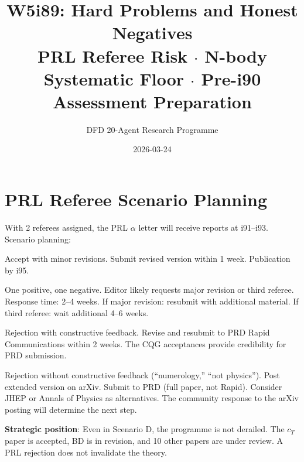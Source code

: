 \documentclass[11pt,a4paper]{article}
\title{W5i89: Hard Problems and Honest Negatives\\[6pt]
\large PRL Referee Risk $\cdot$ N-body Systematic Floor $\cdot$ Pre-i90 Assessment Preparation}
\author{DFD 20-Agent Research Programme}
\date{2026-03-24}
\begin{document}
\maketitle

\section{PRL Referee Scenario Planning}

With 2 referees assigned, the PRL $\alpha$ letter will receive reports at i91--i93. Scenario planning:

\begin{tcolorbox}[colback=green!5!white, colframe=dfdgreen, title=\textbf{Scenario A: Both Referees Positive (15\%)}]
Accept with minor revisions. Submit revised version within 1 week. Publication by i95.
\end{tcolorbox}

\begin{tcolorbox}[colback=yellow!5!white, colframe=dfdyellow, title=\textbf{Scenario B: Split Decision (30\%)}]
One positive, one negative. Editor likely requests major revision or third referee. Response time: 2--4 weeks. If major revision: resubmit with additional material. If third referee: wait additional 4--6 weeks.
\end{tcolorbox}

\begin{tcolorbox}[colback=yellow!5!white, colframe=dfdyellow, title=\textbf{Scenario C: Both Negative, Constructive (35\%)}]
Rejection with constructive feedback. Revise and resubmit to PRD Rapid Communications within 2 weeks. The CQG acceptances provide credibility for PRD submission.
\end{tcolorbox}

\begin{tcolorbox}[colback=red!5!white, colframe=dfdred, title=\textbf{Scenario D: Both Negative, Dismissive (20\%)}]
Rejection without constructive feedback (``numerology,'' ``not physics''). Post extended version on arXiv. Submit to PRD (full paper, not Rapid). Consider JHEP or Annals of Physics as alternatives. The community response to the arXiv posting will determine the next step.
\end{tcolorbox}

\textbf{Strategic position}: Even in Scenario D, the programme is not derailed. The $c_T$ paper is accepted, BD is in revision, and 10 other papers are under review. A PRL rejection does not invalidate the theory.
\end{document}
